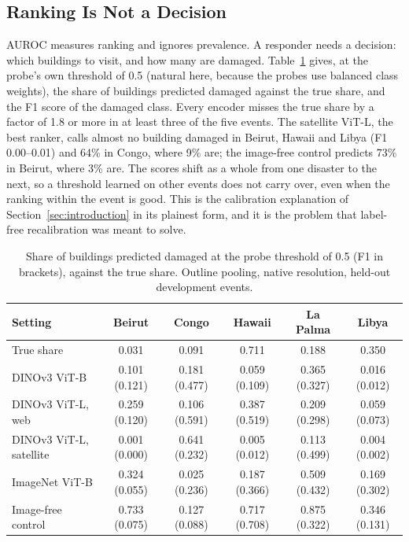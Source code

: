 \documentclass{ieeeaccess}
\begin{document}
\subsection{Ranking Is Not a Decision}
\label{sec:res-threshold}
AUROC measures ranking and ignores prevalence. A responder needs a decision: which buildings to visit, and how many are damaged. Table~\ref{tab:threshold} gives, at the probe's own threshold of 0.5 (natural here, because the probes use balanced class weights), the share of buildings predicted damaged against the true share, and the F1 score of the damaged class. Every encoder misses the true share by a factor of 1.8 or more in at least three of the five events. The satellite ViT-L, the best ranker, calls almost no building damaged in Beirut, Hawaii and Libya (F1 0.00--0.01) and 64\% in Congo, where 9\% are; the image-free control predicts 73\% in Beirut, where 3\% are. The scores shift as a whole from one disaster to the next, so a threshold learned on other events does not carry over, even when the ranking within the event is good. This is the calibration explanation of Section~\ref{sec:introduction} in its plainest form, and it is the problem that label-free recalibration was meant to solve.

\begin{table}[t]
\centering
\caption{Share of buildings predicted damaged at the probe threshold of 0.5 (F1 in brackets), against the true share. Outline pooling, native resolution, held-out development events.}
\label{tab:threshold}
\footnotesize
\begin{tabular}{@{}lccccc@{}}
\toprule
Setting & Beirut & Congo & Hawaii & La Palma & Libya \\
\midrule
True share & 0.031 & 0.091 & 0.711 & 0.188 & 0.350 \\
\midrule
DINOv3 ViT-B & 0.101 (0.121) & 0.181 (0.477) & 0.059 (0.109) & 0.365 (0.327) & 0.016 (0.012) \\
DINOv3 ViT-L, web & 0.259 (0.120) & 0.106 (0.591) & 0.387 (0.519) & 0.209 (0.298) & 0.059 (0.073) \\
DINOv3 ViT-L, satellite & 0.001 (0.000) & 0.641 (0.232) & 0.005 (0.012) & 0.113 (0.499) & 0.004 (0.002) \\
ImageNet ViT-B & 0.324 (0.055) & 0.025 (0.236) & 0.187 (0.366) & 0.509 (0.432) & 0.169 (0.302) \\
Image-free control & 0.733 (0.075) & 0.127 (0.088) & 0.717 (0.708) & 0.875 (0.322) & 0.346 (0.131) \\
\bottomrule
\end{tabular}
\end{table}
\end{document}
